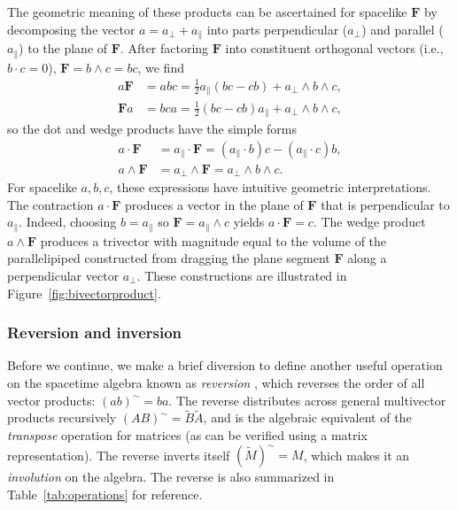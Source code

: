 \documentclass[1p,sort&compress]{elsarticle}
\numberwithin{equation}{section}
\newcommand{\bv}[1]{\mathbf{#1}}
\begin{document}
The geometric meaning of these products can be ascertained for spacelike $\bv{F}$ by decomposing the vector $a = a_\perp + a_\parallel$ into parts perpendicular ($a_\perp$) and parallel ($a_\parallel$) to the plane of $\bv{F}$.  After factoring $\bv{F}$ into constituent orthogonal vectors (i.e., $b\cdot c = 0$), $\bv{F} = b\wedge c = bc$, we find
\begin{align}
  a \bv{F} &= abc = \frac{1}{2}a_\parallel(bc - cb) + a_\perp \wedge b \wedge c, \\
  \bv{F} a &= bca = \frac{1}{2}(bc - cb)a_\parallel + a_\perp \wedge b \wedge c, 
\end{align}
so the dot and wedge products have the simple forms
\begin{align}\label{eq:bivectordot}
  a\cdot \bv{F} &= a_\parallel \cdot \bv{F} = (a_\parallel\cdot b)c - (a_\parallel \cdot c)b, \\
  \label{eq:bivectorwedge}
  a\wedge \bv{F} &= a_\perp \wedge \bv{F} = a_\perp \wedge b \wedge c.
\end{align}
For spacelike $a,b,c$, these expressions have intuitive geometric interpretations.  The contraction $a\cdot \bv{F}$ produces a vector in the plane of $\bv{F}$ that is perpendicular to $a_\parallel$.  Indeed, choosing $b=a_\parallel$ so $\bv{F}=a_\parallel\wedge c$ yields $a\cdot \bv{F} = c$.  The wedge product $a\wedge \bv{F}$ produces a trivector with magnitude equal to the volume of the parallelipiped constructed from dragging the plane segment $\bv{F}$ along a perpendicular vector $a_\perp$.  These constructions are illustrated in Figure~\ref{fig:bivectorproduct}.


\subsubsection{Reversion and inversion}\label{sec:reversion}


Before we continue, we make a brief diversion to define another useful operation on the spacetime algebra known as \emph{reversion} \cite{Hestenes1987}, which reverses the order of all vector products: $(ab)^\sim = ba$.  The reverse distributes across general multivector products recursively $(AB)^{\sim} = \widetilde{B}\widetilde{A}$, and is the algebraic equivalent of the \emph{transpose} operation for matrices (as can be verified using a matrix representation).  The reverse inverts itself $(\widetilde{M})^\sim = M$, which makes it an \emph{involution} on the algebra.  The reverse is also summarized in Table~\ref{tab:operations} for reference.
\end{document}
